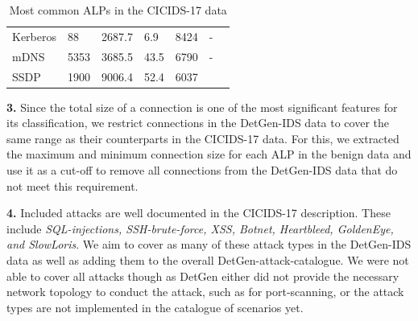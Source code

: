 \documentclass[runningheads]{llncs}
\begin{document}
\begin{table}[h!]
\begin{tabular}{p{1.5cm}|p{1cm}|p{1.7cm}|p{2cm}|p{1.7cm}||p{1.7cm}|p{2cm}}
Kerberos&88  &                 2687.7&         6.9   &        8424& -&\\
mDNS&5353     &            3685.5    &    43.5      &     6790 & -&\\
SSDP&1900      &           9006.4    &    52.4     &      6037&&\\
\end{tabular}
\caption{Most common ALPs in the CICIDS-17 data}\label{Tab:ALPs}
\end{table}


\textbf{3.} Since the total size of a connection is one of the most significant features for its classification, we restrict connections in the DetGen-IDS data to cover the same range as their counterparts in the CICIDS-17 data. For this, we extracted the maximum and minimum connection size for each ALP in the benign data and use it as a cut-off to remove all connections from the DetGen-IDS data that do not meet this requirement.

\textbf{4.} Included attacks are well documented in the CICIDS-17 description. These include \textit{SQL-injections, SSH-brute-force, XSS, Botnet, Heartbleed, GoldenEye, and SlowLoris}. We aim to cover as many of these attack types in the DetGen-IDS data as well as adding them to the overall DetGen-attack-catalogue. We were not able to cover all attacks though as DetGen either did not provide the necessary network topology to conduct the attack, such as for port-scanning, or the attack types are not implemented in the catalogue of scenarios yet. 
\end{document}
